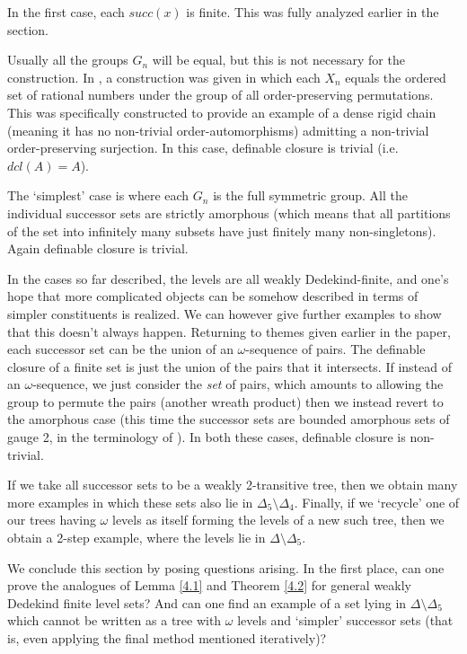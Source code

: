 \documentclass[a4paper,reqno]{amsart}
\numberwithin{equation}{section}
\begin{document}
In the first case, each $succ(x)$ is finite. This was fully analyzed earlier in the section.

Usually all the groups $G_n$ will be equal, but this is not necessary for the construction. In 
\cite{Ballesteros}, a construction was given in which each $X_n$ equals the ordered set of rational numbers
under the group of all order-preserving permutations. This was specifically constructed to provide an example of 
a dense rigid chain (meaning it has no non-trivial order-automorphisms) admitting a non-trivial order-preserving 
surjection. In this case, definable closure is trivial (i.e. $dcl(A) = A$).

The `simplest' case is where each $G_n$ is the full symmetric group. All the individual successor sets are 
strictly amorphous (which means that all partitions of the set into infinitely many subsets have just finitely many 
non-singletons). Again definable closure is trivial.

In the cases so far described, the levels are all weakly Dedekind-finite, and one's hope that more complicated objects 
can be somehow described in terms of simpler constituents is realized. We can however give further examples to show 
that this doesn't always happen. Returning to themes given earlier in the paper, each successor set can be the union
of an $\omega$-sequence of pairs. The definable closure of a finite set is just the union of the pairs that it
intersects. If instead of an $\omega$-sequence, we just consider the {\em set} of pairs, which amounts to allowing
the group to permute the pairs (another wreath product) then we instead revert to the amorphous case (this time 
the successor sets are bounded amorphous sets of gauge 2, in the terminology of \cite{Truss3}). In both these
cases, definable closure is non-trivial.

If we take all successor sets to be a weakly 2-transitive tree, then we obtain many more examples in which these sets 
also lie in $\Delta_5 \setminus \Delta_4$. Finally, if we `recycle' one of our trees having $\omega$ levels as itself 
forming the levels of a new such tree, then we obtain a 2-step example, where the levels lie in $\Delta \setminus \Delta_5$.

We conclude this section by posing questions arising. In the first place, can one prove the analogues of 
Lemma \ref{4.1} and Theorem \ref{4.2} for general weakly Dedekind finite level sets? And can one find an example of a set
lying in $\Delta \setminus \Delta_5$ which cannot be written as a tree with $\omega$ levels and `simpler'
successor sets (that is, even applying the final method mentioned iteratively)?
\end{document}
